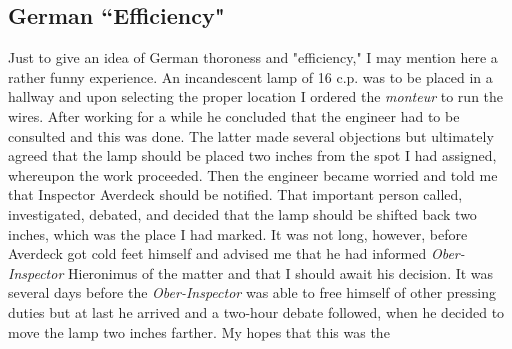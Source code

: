 \documentclass[a4paper,12pt,english,twoside,openright]{memoir}
\begin{document}
\subsection{German ``Efficiency"}
Just to give an idea of German thoroness and "efficiency," I may mention here a rather funny 
experience.  An incandescent lamp of 16 c.p.  was to be placed in a hallway and upon selecting 
the proper location I ordered the \emph{monteur} to run the wires.  After working for a while he concluded 
that the engineer had to be consulted and this was done.  The latter made several objections but 
ultimately agreed that the lamp should be placed two inches from the spot I had assigned, 
whereupon the work proceeded.  Then the engineer became worried and told me that Inspector 
Averdeck should be notified.  That important person called, investigated, debated, and decided 
that the lamp should be shifted back two inches, which was the place I had marked.  It was not 
long, however, before Averdeck got cold feet himself and advised me that he had informed \emph{Ober-Inspector} Hieronimus of the matter and that I should await his decision.  It was several days 
before the \emph{Ober-Inspector} was able to free himself of other pressing duties but at last he arrived 
and a two-hour debate followed, when he decided to move the lamp two inches farther.  My hopes that this was the 
\end{document}
